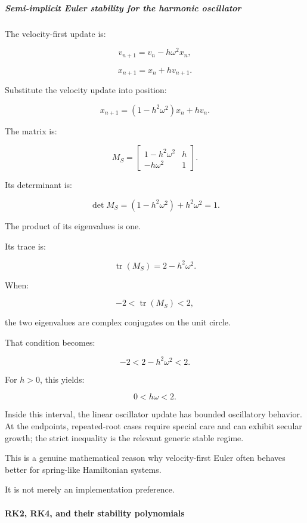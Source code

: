 \subparagraph{Semi-implicit Euler stability for the harmonic oscillator}\label{02-foundations-ii-ch025-semi-implicit-euler-stability-for-the-harmonic-oscillator}

The velocity-first update is:

\[
v_{n+1}=v_n-h\omega^2x_n,
\]

\[
x_{n+1}=x_n+hv_{n+1}.
\]

Substitute the velocity update into position:

\[
x_{n+1} =(1-h^2\omega^2)x_n+hv_n.
\]

The matrix is:

\[
\boxed{ M_S= \begin{bmatrix} 1-h^2\omega^2&h\\ -h\omega^2&1 \end{bmatrix} }.
\]

Its determinant is:

\[
\det M_S =(1-h^2\omega^2)+h^2\omega^2=1.
\]

The product of its eigenvalues is one.

Its trace is:

\[
\operatorname{tr}(M_S)=2-h^2\omega^2.
\]

When:

\[
-2<\operatorname{tr}(M_S)<2,
\]

the two eigenvalues are complex conjugates on the unit circle.

That condition becomes:

\[
-2<2-h^2\omega^2<2.
\]

For \(h>0\), this yields:

\[
\boxed{0<h\omega<2}.
\]

Inside this interval, the linear oscillator update has bounded oscillatory behavior. At the endpoints, repeated-root cases require special care and can exhibit secular growth; the strict inequality is the relevant generic stable regime.

This is a genuine mathematical reason why velocity-first Euler often behaves better for spring-like Hamiltonian systems.

It is not merely an implementation preference.

\paragraph{RK2, RK4, and their stability polynomials}\label{02-foundations-ii-ch025-rk2-rk4-and-their-stability-polynomials}

